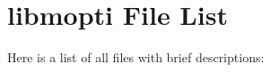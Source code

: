 \section{libmopti File List}
Here is a list of all files with brief descriptions:\begin{CompactList}
\item{}
\item{}
\end{CompactList}
